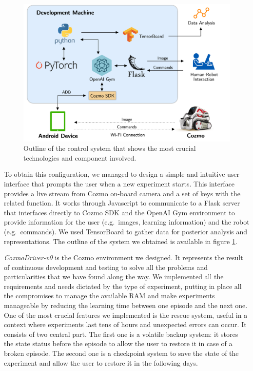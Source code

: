 \documentclass[10pt,twocolumn,letterpaper]{article}
\begin{document}
\begin{figure}[tbp]
    \centering
    \includegraphics[width=0.97\columnwidth]{cozmo-system.png}
    \caption[Outline of the control system]{Outline of the control system that shows the most crucial technologies and component involved.}
    \label{system}
\end{figure}

To obtain this configuration, we managed to design a simple and intuitive user interface that prompts the user when a new experiment starts.
This interface provides a live stream from Cozmo on-board camera and a set of keys with the related function.
It works through Javascript to communicate to a Flask server that interfaces directly to Cozmo SDK and the OpenAI Gym environment to provide information for the user (e.g.\ images, learning information) and the robot (e.g.\ commands).
We used TensorBoard to gather data for posterior analysis and representations.
The outline of the system we obtained is available in figure \ref{system}.

\textit{CozmoDriver-v0} is the Cozmo environment we designed.
It represents the result of continuous development and testing to solve all the problems and particularities that we have found along the way.
We implemented all the requirements and needs dictated by the type of experiment, putting in place all the compromises to manage the available RAM and make experiments manageable by reducing the learning time between one episode and the next one.
One of the most crucial features we implemented is the rescue system, useful in a context where experiments last tens of hours and unexpected errors can occur.
It consists of two central part.
The first one is a volatile backup system: it stores the state status before the episode to allow the user to restore it in case of a broken episode.
The second one is a checkpoint system to save the state of the experiment and allow the user to restore it in the following days.
%
\end{document}

